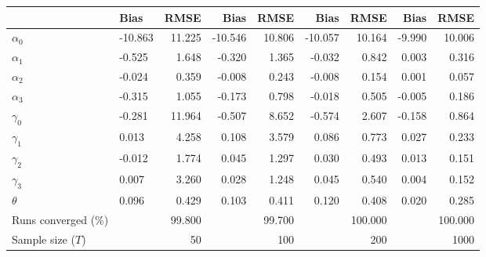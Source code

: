 
\begin{tabular}[t]{llrrrrrrr}
\toprule
  & Bias & RMSE & Bias & RMSE & Bias & RMSE & Bias & RMSE\\
\midrule
$\alpha_{0}$ & -10.863 & 11.225 & -10.546 & 10.806 & -10.057 & 10.164 & -9.990 & 10.006\\
$\alpha_{1}$ & -0.525 & 1.648 & -0.320 & 1.365 & -0.032 & 0.842 & 0.003 & 0.316\\
$\alpha_{2}$ & -0.024 & 0.359 & -0.008 & 0.243 & -0.008 & 0.154 & 0.001 & 0.057\\
$\alpha_{3}$ & -0.315 & 1.055 & -0.173 & 0.798 & -0.018 & 0.505 & -0.005 & 0.186\\
$\gamma_{0}$ & -0.281 & 11.964 & -0.507 & 8.652 & -0.574 & 2.607 & -0.158 & 0.864\\
$\gamma_{1}$ & 0.013 & 4.258 & 0.108 & 3.579 & 0.086 & 0.773 & 0.027 & 0.233\\
$\gamma_{2}$ & -0.012 & 1.774 & 0.045 & 1.297 & 0.030 & 0.493 & 0.013 & 0.151\\
$\gamma_{3}$ & 0.007 & 3.260 & 0.028 & 1.248 & 0.045 & 0.540 & 0.004 & 0.152\\
$\theta$ & 0.096 & 0.429 & 0.103 & 0.411 & 0.120 & 0.408 & 0.020 & 0.285\\
Runs converged (\%) &  & 99.800 &  & 99.700 &  & 100.000 &  & 100.000\\
Sample size ($T$) &  & 50 &  & 100 &  & 200 &  & 1000\\
\bottomrule
\end{tabular}
